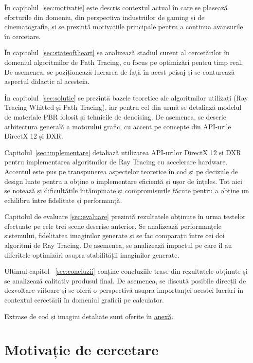 \documentclass[12pt,a4paper]{report}
\numberwithin{equation}{section} %
\begin{document}
În capitolul~\ref{sec:motivatie} este descris contextul actual în care se plasează
eforturile din domeniu, din perspectiva industriilor de gaming și de cinematografie,
și se prezintă motivațiile principale pentru a continua avansurile în cercetare.

În capitolul~\ref{sec:stateoftheart} se analizează stadiul curent al cercetărilor
în domeniul algoritmilor de Path Tracing, cu focus pe optimizări pentru timp real.
De asemenea, se poziționează lucrarea de față în acest peisaj și se conturează
aspectul didactic al acesteia.

În capitolul~\ref{sec:solutie} se prezintă bazele teoretice ale algoritmilor
utilizați (Ray Tracing Whitted și Path Tracing), iar pentru cel din urmă se
detaliază modelul de materiale PBR folosit și tehnicile de denoising. De asemenea, se descrie arhitectura
generală a motorului grafic, cu accent pe concepte din API-urile DirectX 12 și
DXR.

Capitolul~\ref{sec:implementare} detaliază utilizarea API-urilor DirectX 12 și DXR
pentru implementarea algoritmilor de Ray Tracing cu accelerare hardware. Accentul
este pus pe transpunerea aspectelor teoretice în cod și pe deciziile de design luate pentru a obține o implementare
eficientă și ușor de înțeles. Tot aici se notează și dificultățile întâmpinate
și compromisurile făcute pentru a obține un echilibru între fidelitate și performanță.

Capitolul de evaluare \ref{sec:evaluare} prezintă rezultatele obținute
în urma testelor efectuate pe cele trei scene descrise anterior. Se analizează
performanțele sistemului, fidelitatea imaginilor generate și se fac comparații
între cei doi algoritmi de Ray Tracing. De asemenea, se analizează impactul pe
care îl au diferitele optimizări asupra stabilității imaginilor generate.

Ultimul capitol ~\ref{sec:concluzii} conține concluziile trase din
rezultatele obținute și se analizează calitativ produsul final. De asemenea, se
discută posibile direcții de dezvoltare viitoare și se oferă o perspectivă asupra
importanței acestei lucrări în contextul cercetării în domeniul graficii pe calculator.

Extrase de cod și imagini detaliate sunt oferite în \hyperref[anexa]{anexă}.

\chapter{\label{sec:motivatie}Motivație de cercetare}
\end{document}
